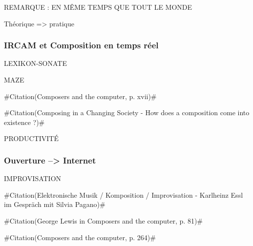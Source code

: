\documentclass[a4paper,12pt]{article}
\newcommand{\guill}[1]{«~#1~»}
\newcommand{\zitat}[2]{\#Citation(#2)\#}
\begin{document}
REMARQUE : EN MÊME TEMPS QUE TOUT LE MONDE


Théorique => pratique

\subsubsection{IRCAM et Composition en temps réel}

LEXIKON-SONATE

MAZE

\zitat{Many digital instruments can be attached to inexpensive personal computers. The proliferation of inexpensive computers puts the capability of intelligent instruments within the reach of virtually every musician who wants them.}
{Composers and the computer, p. xvii}

\zitat{+ description du processus de composition}
{Composing in a Changing Society - How does a composition come into existence ?}

PRODUCTIVITÉ

\subsubsection{Ouverture --> Internet}

IMPROVISATION

\zitat{Ohne Computer wäre meine Arbeit schwer vorstellbar, selbst wenn ich Instrumentalmusik mache; dadurch war es mir möglich, aus meinem kompositorischen Elfenbeinturm auszubrechen.}
{Elektronische Musik / Komposition / Improvisation - Karlheinz Essl im Gespräch mit Silvia Pagano}

\zitat{I think it [improvisation] is a healthy situation overall. Many people are trying to learn to improvise, because it has traditionally been a wonderful way to learn about the possibilities of making music. There is a lot of interesting activity among improvisers --- new methods of strcturing, advanced ideas of how to integrate scores with improvisation, interesting new souunds, extended notions of what an \emph{instrument} is, what a \emph{virtuoso} is, what a performer's role is.}
{George Lewis in Composers and the computer, p. 81}

\zitat{[Tristan] Perich tells me that his compositions spring from improvisation, the mind at play --- usually at the piano, which is his main instrument. He constrats this with other composers who use algorithms, which introduce complications. \guill{There's a difference between process being part of the inspiration or the tool set that you have, and process being a determinant.} He prefers the former.}
{Composers and the computer, p. 264}
\end{document}
